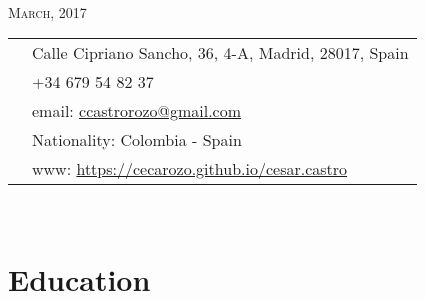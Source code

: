 \documentclass[11pt]{article}\usepackage[]{graphicx}\usepackage[]{color}
\begin{document}
\par{\\
\vspace{5pt}
{\color{headings} \scshape{March, 2017}}\\
\vspace{10pt}}

\colorbox{shade}{{
\begin{tabular}{c|p{13cm}}
\vspace{5pt}\raisebox{-4pt}{\textifsymbol{18}} & Calle Cipriano Sancho, 36, 4-A, Madrid, 28017, Spain\\
\vspace{5pt}\raisebox{-4pt}{\Mobilefone} & +34 679 54 82 37\\
\vspace{5pt}\raisebox{-4pt}{\Letter} & email: \href{mailto:castrorozo@gmail.com}{ccastrorozo@gmail.com} \\
\vspace{5pt}\raisebox{-4pt}{\Aquarius} & Nationality: Colombia - Spain\\
\vspace{5pt}\raisebox{-4pt}{\Mundus} & www: \href{https://cecarozo.github.io/cesar.castro}{https://cecarozo.github.io/cesar.castro}\\
\end{tabular}
}
}\\[10pt]


\section{Education} 
\end{document}
